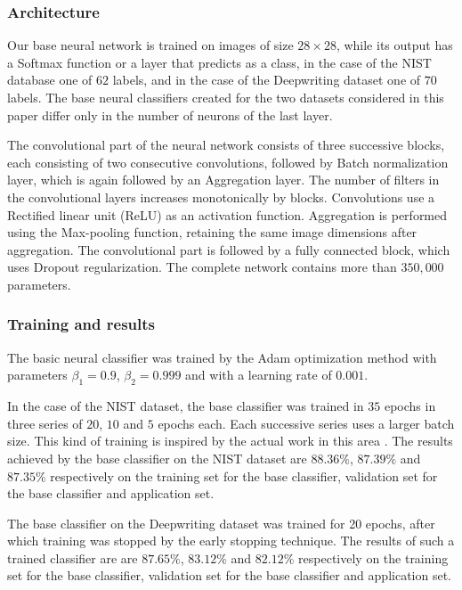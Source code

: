 \documentclass{article}
\begin{document}
\subsubsection{Architecture}

Our base neural network is trained on images of size $28 \times 28$, while its output has a Softmax function or a layer that predicts as a class, in the case of the NIST database one of $62$ labels,
and in the case of the Deepwriting dataset one of $70$ labels.
The base neural classifiers created for the two datasets considered in this paper differ only in the number of neurons of the last layer.

The convolutional part of the neural network consists of three successive blocks, each consisting of two consecutive convolutions, followed by Batch normalization layer,
which is again followed by an Aggregation layer.
The number of filters in the convolutional layers increases monotonically by blocks.
Convolutions use a Rectified linear unit (ReLU) as an activation function.
Aggregation is performed using the Max-pooling function, retaining the same image dimensions after aggregation.
The convolutional part is followed by a fully connected block, which uses Dropout regularization.
The complete network contains more than $350,000$ parameters.

\subsubsection{Training and results}

The basic neural classifier was trained by the Adam optimization method with parameters $\beta_1=0.9$, $\beta_2=0.999$ and with a learning rate of $0.001$.

In the case of the NIST dataset, the base classifier was trained in $35$ epochs in three series of $20$, $10$ and $5$ epochs each.
Each successive series uses a larger batch size.
This kind of training is inspired by the actual work in this area \citep{lrbs}.
The results achieved by the base classifier on the NIST dataset are $88.36\%$, $87.39\%$ and $87.35\%$ respectively on the training set for the base classifier, validation set for the base classifier and application set.

The base classifier on the Deepwriting dataset was trained for 20 epochs, after which training was stopped by the early stopping technique.
The results of such a trained classifier are are $87.65\%$, $83.12\%$ and $82.12\%$ respectively on the training set for the base classifier, validation set for the base classifier and application set.
\end{document}
